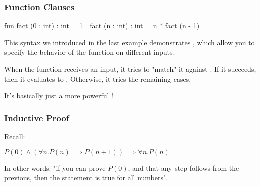 \documentclass[aspectratio=169]{beamer}
\begin{document}
\begin{frame}[fragile]
  \frametitle{Function Clauses}

  \begin{codeblock}
    fun fact (0 : int) : int = 1 
      | fact (n : int) : int = n * fact (n - 1)
  \end{codeblock}

  \vspace{\fill}

  This syntax we introduced in the last example demonstrates 
  , which allow you to specify the
  behavior of the function on different inputs.

  \vspace{\fill}

  When the  function receives an input, it tries to 
  "match" it against . If it succeeds, then it evaluates to
  . Otherwise, it tries the remaining cases.

  \vspace{5pt}

  It's basically just a more powerful !
\end{frame}

\begin{frame}[fragile]
  \frametitle{Inductive Proof}

  Recall:

  \vspace{\fill}


  \vspace{5pt}

  \begin{center}
     $P(0) \land (\forall n. P(n) \implies P(n + 1)) \implies \forall n. P(n)$
  \end{center}

  \vspace{\fill}

  In other words: "if you can prove $P(0)$, and that any step follows from the 
  previous, then the statement is true for all numbers".
\end{frame}
\end{document}
